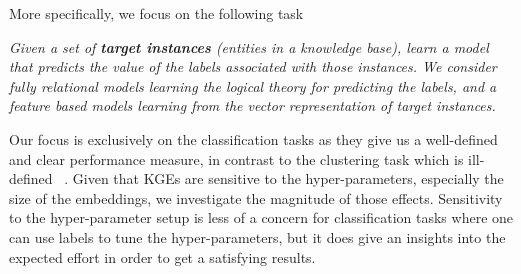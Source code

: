 
\noindent More specifically, we focus on the following task

\begin{displayquote}
\textit{Given a set of \textbf{target instances} (entities in a knowledge base), learn a model that predicts the value of the labels associated with those instances. We consider fully relational models learning the logical theory for predicting the labels, and a feature based models learning from the vector representation of target instances.}
\end{displayquote}


Our focus is exclusively on the classification tasks as they give us a well-defined and clear performance measure, in contrast to the clustering task which is ill-defined ~\cite{Estivill-Castro:2002}.
Given that KGEs are sensitive to the hyper-parameters, especially the size of the embeddings, we investigate the magnitude of those effects.
Sensitivity to the hyper-parameter setup is less of a concern for classification tasks where one can use labels to tune the hyper-parameters, but it does give an insights into the expected effort in order to get a satisfying results. 





